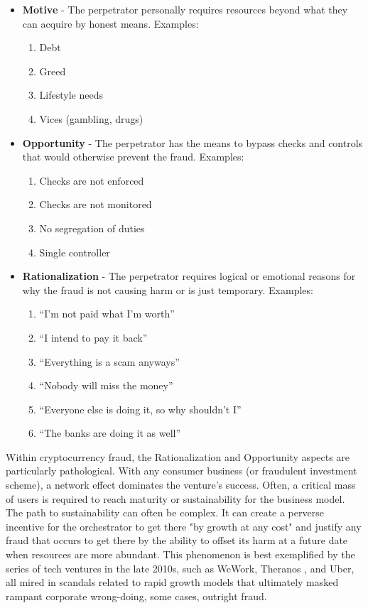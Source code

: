 \begin{itemize}
\tightlist
\item
  \textbf{Motive} - The perpetrator personally requires resources beyond what
  they can acquire by honest means. Examples:

  \begin{enumerate}
  \def\labelenumi{\arabic{enumi}.}
  \tightlist
  \item
    Debt
  \item
    Greed
  \item
    Lifestyle needs
  \item
    Vices (gambling, drugs)
  \end{enumerate}
\item
  \textbf{Opportunity} - The perpetrator has the means to bypass checks and
  controls that would otherwise prevent the fraud. Examples:

  \begin{enumerate}
  \def\labelenumi{\arabic{enumi}.}
  \tightlist
  \item
    Checks are not enforced
  \item
    Checks are not monitored
  \item
    No segregation of duties
  \item
    Single controller
  \end{enumerate}
\item
  \textbf{Rationalization} - The perpetrator requires logical or emotional
  reasons for why the fraud is not causing harm or is just temporary.
  Examples:

  \begin{enumerate}
  \def\labelenumi{\arabic{enumi}.}
  \tightlist
  \item
    ``I'm not paid what I'm worth''
  \item
    ``I intend to pay it back''
  \item
    ``Everything is a scam anyways''
  \item
    ``Nobody will miss the money''
  \item
    ``Everyone else is doing it, so why shouldn't I''
  \item
    ``The banks are doing it as well''
  \end{enumerate}
\end{itemize}

Within cryptocurrency fraud, the Rationalization and Opportunity aspects are
particularly pathological. With any consumer business (or fraudulent investment
scheme), a network effect dominates the venture's success. Often, a critical
mass of users is required to reach maturity or sustainability for the business
model. The path to sustainability can often be complex. It can create a perverse
incentive for the orchestrator to get there "by growth at any cost" and justify
any fraud that occurs to get there by the ability to offset its harm at a future
date when resources are more abundant. This phenomenon is best exemplified by
the series of tech ventures in the late 2010s, such as WeWork, Theranos
\cite{hans_how_2020}, and Uber, all mired in scandals related to rapid growth
models that ultimately masked rampant corporate wrong-doing, some cases,
outright fraud.

